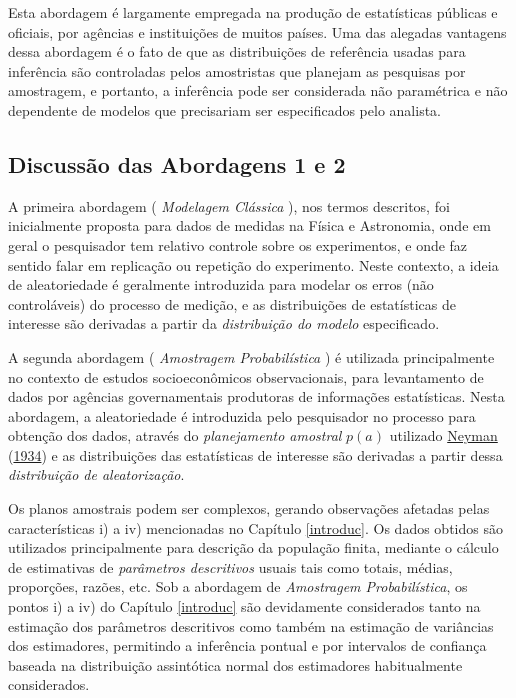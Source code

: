 \documentclass[
  12pt,
  brazilian,
]{book}
\theoremstyle{definition}
\theoremstyle{definition}
\theoremstyle{definition}
\theoremstyle{definition}
\theoremstyle{remark}
\begin{document}
Esta abordagem é largamente empregada na produção de estatísticas públicas e
oficiais, por agências e instituições de muitos países. Uma das alegadas
vantagens dessa abordagem é o fato de que as distribuições de referência usadas
para inferência são controladas pelos amostristas que planejam as pesquisas por
amostragem, e portanto, a inferência pode ser considerada não paramétrica e não
dependente de modelos que precisariam ser especificados pelo analista.

\hypertarget{discussuxe3o-das-abordagens-1-e-2}{%
\subsection{Discussão das Abordagens 1 e 2}\label{discussuxe3o-das-abordagens-1-e-2}}

A primeira abordagem ( \emph{Modelagem Clássica} ), nos termos descritos, foi
inicialmente proposta para dados de medidas na Física e Astronomia, onde em
geral o pesquisador tem relativo controle sobre os experimentos, e onde faz
sentido falar em replicação ou repetição do experimento. Neste contexto, a ideia
de aleatoriedade é geralmente introduzida para modelar os erros (não
controláveis) do processo de medição, e as distribuições de estatísticas de
interesse são derivadas a partir da \emph{distribuição do modelo} especificado.

A segunda abordagem ( \emph{Amostragem Probabilística} ) é utilizada principalmente
no contexto de estudos socioeconômicos observacionais, para levantamento de
dados por agências governamentais produtoras de informações estatísticas. Nesta
abordagem, a aleatoriedade é introduzida pelo pesquisador no processo para
obtenção dos dados, através do \emph{planejamento amostral} \(p(a)\) utilizado
\protect\hyperlink{ref-Neyman}{Neyman} (\protect\hyperlink{ref-Neyman}{1934}) e as distribuições das estatísticas de interesse são derivadas a
partir dessa \emph{distribuição de aleatorização}.

Os planos amostrais podem ser complexos, gerando observações afetadas pelas
características i) a iv) mencionadas no Capítulo \ref{introduc}. Os dados
obtidos são utilizados principalmente para descrição da população finita,
mediante o cálculo de estimativas de \emph{parâmetros descritivos} usuais tais como
totais, médias, proporções, razões, etc. Sob a abordagem de \emph{Amostragem
Probabilística}, os pontos i) a iv) do Capítulo \ref{introduc} são devidamente
considerados tanto na estimação dos parâmetros descritivos como também na
estimação de variâncias dos estimadores, permitindo a inferência pontual e por
intervalos de confiança baseada na distribuição assintótica normal dos
estimadores habitualmente considerados.
\end{document}
